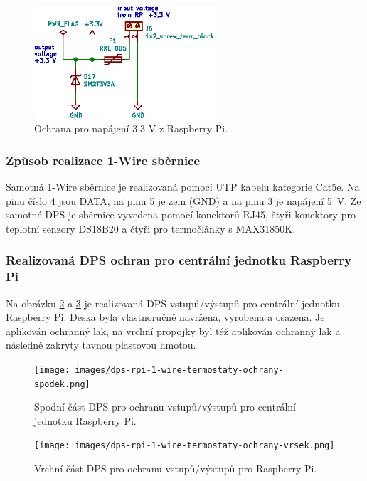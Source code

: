 \begin{figure}[H]
    \centering
    \includegraphics[width=0.6\textwidth]{images/svg/kicad/ochrana-napajeni-3_3-v.eps}
    \caption[Ochrana pro napájení 3,3 V z Raspberry Pi.]{Ochrana pro napájení 3,3 V z Raspberry Pi.}
    \label{fig:ochrana-napajeni-3_3-v}
\end{figure}

\subsubsection{Způsob realizace 1-Wire sběrnice}
Samotná 1-Wire sběrnice je realizovaná pomocí UTP kabelu kategorie Cat5e. Na pinu číslo 4 jsou DATA, na pinu 5 je zem (GND) a na pinu 3 je napájení 5~V. Ze samotné DPS je sběrnice vyvedena pomocí konektorů RJ45, čtyři konektory pro teplotní senzory DS18B20 a čtyři pro termočlánky s MAX31850K.

\subsubsection{Realizovaná DPS ochran pro centrální jednotku Raspberry Pi}
Na obrázku \ref{fig:dps-rpi-1-wire-termostaty-ochrany-spodek} a \ref{fig:dps-rpi-1-wire-termostaty-ochrany-vrsek} je realizovaná DPS vstupů/výstupů pro centrální jednotku Raspberry Pi. Deska byla vlastnoručně navržena, vyrobena a osazena. Je aplikován ochranný lak, na vrchní propojky byl též aplikován ochranný lak a následně zakryty tavnou plastovou hmotou.

\begin{figure}[H]
    \centering
    \texttt{[image: images/dps-rpi-1-wire-termostaty-ochrany-spodek.png]}
    \caption[Spodní část DPS pro ochranu vstupů/výstupů pro centrální jednotku Raspberry Pi.]{Spodní část DPS pro ochranu vstupů/výstupů pro centrální jednotku Raspberry Pi.}
    \label{fig:dps-rpi-1-wire-termostaty-ochrany-spodek}
\end{figure}

\begin{figure}[H]
    \centering
    \texttt{[image: images/dps-rpi-1-wire-termostaty-ochrany-vrsek.png]}
    \caption[Vrchní část DPS pro ochranu vstupů/výstupů pro Raspberry Pi.]{Vrchní část DPS pro ochranu vstupů/výstupů pro Raspberry Pi.}
    \label{fig:dps-rpi-1-wire-termostaty-ochrany-vrsek}
\end{figure}

